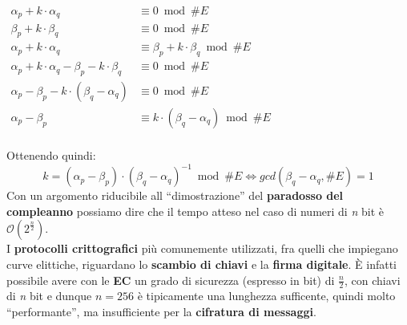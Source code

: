 \begin{center}
    \begin{math}
        \begin{aligned}
            \alpha_p + k \cdot \alpha_q &\equiv 0 \bmod \#E \\
            \beta_p + k \cdot \beta_q &\equiv 0 \bmod \#E \\
            \alpha_p + k \cdot \alpha_q &\equiv \beta_p + k \cdot \beta_q \bmod \#E \\
            \alpha_p + k \cdot \alpha_q - \beta_p - k \cdot \beta_q &\equiv 0 \bmod \#E \\
            \alpha_p - \beta_p - k \cdot (\beta_q - \alpha_q) &\equiv 0 \bmod \#E \\
            \alpha_p - \beta_p &\equiv k \cdot (\beta_q - \alpha_q) \bmod \#E \\
        \end{aligned}
    \end{math}
\end{center}
Ottenendo quindi:
$$
k = (\alpha_p - \beta_p) \cdot (\beta_q - \alpha_q)^{-1} \bmod \#E \iff gcd(\beta_q - \alpha_q, \#E) = 1
$$
Con un argomento riducibile all ``dimostrazione'' del \textbf{paradosso del compleanno} possiamo dire che il tempo atteso nel caso di numeri di \textit{n} bit è $\mathcal{O}(2^{\frac{n}{2}})$. \\
I \textbf{protocolli crittografici} più comunemente utilizzati, fra quelli che impiegano curve elittiche, riguardano lo \textbf{scambio di chiavi} e la \textbf{firma digitale}. È infatti possibile avere con le \textbf{EC} un grado di sicurezza (espresso in bit) di $\frac{n}{2}$, con chiavi di \textit{n} bit e dunque $n = 256$ è tipicamente una lunghezza sufficente, quindi molto ``performante'', ma insufficiente per la \textbf{cifratura di messaggi}.

\newpage
